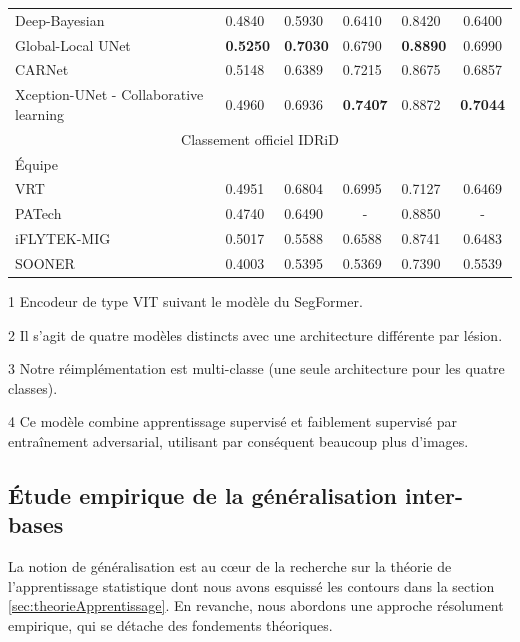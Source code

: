 \begin{table}
\begin{threeparttable}
\begin{tabular}{l lllll c}
			\multicolumn{2}{l}{Deep-Bayesian \cite{garifullinDeepBayesianBaseline2021}} & 0.4840 & 0.5930 & 0.6410 & 0.8420 & 0.6400 \\
			\multicolumn{2}{l}{\tnote{2} Global-Local UNet \cite{yanLearningMutuallyLocalGlobal2019}} & \textbf{0.5250} & \textbf{0.7030} & 0.6790 & \textbf{0.8890} & 0.6990 \\
			\multicolumn{2}{l}{CARNet \cite{guoCARNetCascadeAttentive2022}} & 0.5148 & 0.6389 & 0.7215 & 0.8675 & 0.6857 \\
			\multicolumn{2}{l}{\tnote{4} Xception-UNet - Collaborative learning \cite{zhouCollaborativeLearningSemiSupervised2019}} & 0.4960 & 0.6936 & \textbf{0.7407} & 0.8872 & \textbf{0.7044} \\
			\midrule
			\multicolumn{7}{c}{Classement officiel IDRiD \cite{porwalIDRiDDiabeticRetinopathy2020}}\\
			\midrule
			\multicolumn{2}{l}{Équipe} &  \\ 
			\midrule
			\multicolumn{2}{l}{VRT}& 0.4951 & 0.6804 & 0.6995 & 0.7127 & 0.6469 \\
			\multicolumn{2}{l}{PATech}& 0.4740 & 0.6490 & \multicolumn{1}{c}{-} & 0.8850 & \multicolumn{1}{c}{-}\\
			\multicolumn{2}{l}{iFLYTEK-MIG}& 0.5017 & 0.5588 & 0.6588 & 0.8741 & 0.6483 \\
			\multicolumn{2}{l}{SOONER}& 0.4003 & 0.5395 & 0.5369 & 0.7390 & 0.5539\\
			\bottomrule
		\end{tabular}
	\begin{tablenotes}
		\item[1] Encodeur de type \ac{VIT} suivant le modèle du SegFormer.
		\item[2] Il s'agit de quatre modèles distincts avec une architecture différente par lésion.
		\item[3] Notre réimplémentation est multi-classe (une seule architecture pour les quatre classes).
		\item[4] Ce modèle combine apprentissage supervisé et faiblement supervisé par entraînement adversarial, utilisant par conséquent beaucoup plus d'images.
	\end{tablenotes}
	\end{threeparttable}
\end{table}
\subsection{Étude empirique de la généralisation inter-bases}
\label{sec:generalisation_interbase}
La notion de généralisation est au cœur de la recherche sur la théorie de l'apprentissage statistique dont nous avons esquissé les contours dans la section \ref{sec:theorieApprentissage}. En revanche, nous abordons une approche résolument empirique, qui se détache des fondements théoriques. 
